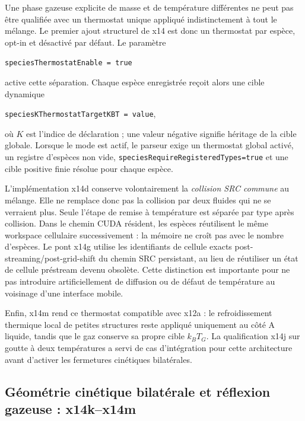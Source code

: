 \documentclass[11pt,a4paper]{article}
\begin{document}
Une phase gazeuse explicite de masse et de température différentes ne peut pas être qualifiée avec un thermostat unique appliqué indistinctement à tout le mélange. Le premier ajout structurel de x14 est donc un thermostat par espèce, opt-in et désactivé par défaut. Le paramètre
\begin{center}
\small
\nolinkurl{speciesThermostatEnable = true}
\end{center}
active cette séparation. Chaque espèce enregistrée reçoit alors une cible dynamique
\begin{center}
\small
\nolinkurl{speciesKThermostatTargetKBT = value},
\end{center}
où $K$ est l'indice de déclaration ; une valeur négative signifie héritage de la cible globale. Lorsque le mode est actif, le parseur exige un thermostat global activé, un registre d'espèces non vide, \nolinkurl{speciesRequireRegisteredTypes=true} et une cible positive finie résolue pour chaque espèce.

L'implémentation x14d conserve volontairement la \emph{collision SRC commune} au mélange. Elle ne remplace donc pas la collision par deux fluides qui ne se verraient plus. Seule l'étape de remise à température est séparée par type après collision. Dans le chemin CUDA résident, les espèces réutilisent le même workspace cellulaire successivement : la mémoire ne croît pas avec le nombre d'espèces. Le pont x14g utilise les identifiants de cellule exacts post-streaming/post-grid-shift du chemin SRC persistant, au lieu de réutiliser un état de cellule préstream devenu obsolète. Cette distinction est importante pour ne pas introduire artificiellement de diffusion ou de défaut de température au voisinage d'une interface mobile.

Enfin, x14m rend ce thermostat compatible avec x12a : le refroidissement thermique local de petites structures reste appliqué uniquement au côté A liquide, tandis que le gaz conserve sa propre cible $k_BT_G$. La qualification x14j sur goutte à deux températures a servi de cas d'intégration pour cette architecture avant d'activer les fermetures cinétiques bilatérales.

\subsection{Géométrie cinétique bilatérale et réflexion gazeuse : x14k--x14m}
\end{document}
